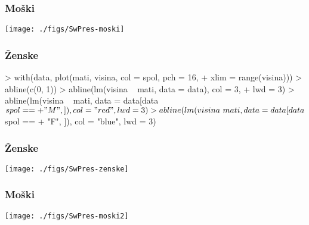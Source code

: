 \begin{frame}[fragile]
\frametitle{Moški}
\texttt{[image: ./figs/SwPres-moski]}
\end{frame}

\begin{frame}[fragile]
\frametitle{Ženske}
\begin{Schunk}
\begin{Sinput}
> with(data, plot(mati, visina, col = spol, pch = 16, 
+     xlim = range(visina)))
> abline(c(0, 1))
> abline(lm(visina ~ mati, data = data), col = 3, 
+     lwd = 3)
> abline(lm(visina ~ mati, data = data[data$spol == 
+     "M", ]), col = "red", lwd = 3)
> abline(lm(visina ~ mati, data = data[data$spol == 
+     "F", ]), col = "blue", lwd = 3)
\end{Sinput}
\end{Schunk}
\end{frame}

\begin{frame}[fragile]
\frametitle{Ženske}
\texttt{[image: ./figs/SwPres-zenske]}
\end{frame}

\begin{frame}[fragile]
\frametitle{Moški}
\texttt{[image: ./figs/SwPres-moski2]}
\end{frame}




%
%
\clearpage
